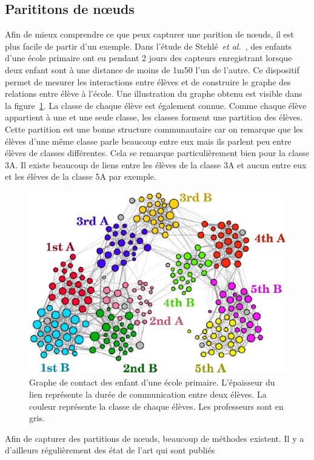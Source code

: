 \subsection{Parititons de n\oe uds}
Afin de mieux comprendre ce que peux capturer une parition de n\oe uds, il est plus facile de partir d'un exemple.
Dans l'étude de Stehlé~\emph{et al.}~\cite{Stehle2011}, des enfants d'une école primaire ont eu pendant 2 jours des capteurs enregistrant lorsque deux enfant sont à une distance de moins de 1m50 l'un de l'autre.
Ce dispositif permet de mesurer les interactions entre élèves et de construire le graphe des relations entre élève à l'école.
Une illustration du graphe obtenu est visible dans la figure~\ref{fig:ecole_primaire}.
La classe de chaque élève est également connue.
Comme chaque élève appartient à une et une seule classe, les classes forment une partition des élèves.
Cette partition est une bonne structure communautaire car on remarque que les élèves d'une même classe parle beaucoup entre eux mais ils parlent peu entre élèves de classes différentes.
Cela se remarque particulièrement bien pour la classe 3A.
Il existe beaucoup de liens entre les élèves de la classe 3A et aucun entre eux et les élèves de la classe 5A par exemple.

\begin{figure}
\centering
\includegraphics[width=0.7\linewidth]{img/Intro/ecole_primaire}
\caption{Graphe de contact des enfant d'une école primaire. L'épaisseur du lien représente la durée de communication entre deux élèves. La couleur représente la classe de chaque élèves. Les professeurs sont en gris.\protect\footnotemark}
\label{fig:ecole_primaire}
\end{figure}

Afin de capturer des partitions de n\oe uds, beaucoup de méthodes existent.
Il y a d'ailleurs régulièrement des état de l'art qui sont publiés~\cite{Fortunato2010,Plantie2013a, Malliaros2013a, Harenberg2014a}

